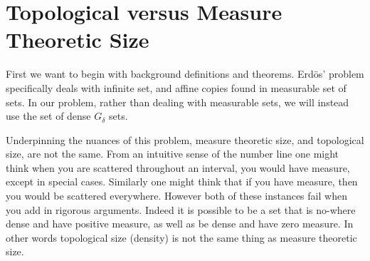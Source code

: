 \section{Topological versus Measure Theoretic Size}

First we want to begin with background definitions and theorems.  Erd\"{o}s' problem specifically deals with infinite set, and affine copies found in measurable set of sets.  In our problem, rather than dealing with measurable sets, we will instead use the set of dense $G_\delta$ sets.  

Underpinning the nuances of this problem, measure theoretic size, and topological size, are not the same. From an intuitive sense of the number line one might think when you are scattered throughout an interval, you would have measure, except in special cases. Similarly one might think that if you have measure, then you would be scattered everywhere.  However both of these instances fail when you add in rigorous arguments.  Indeed it is possible to be a set that is no-where dense and have positive measure, as well as be dense and have zero measure. In other words topological size (density) is not the same thing as measure theoretic size. 






